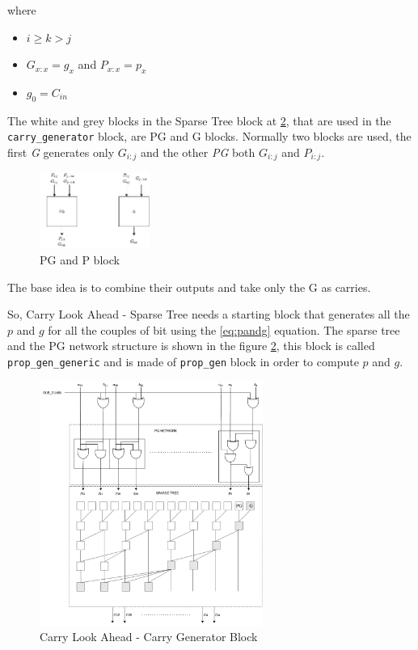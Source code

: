 \begin{itemize}
    where
    \begin{itemize}
        \itemsep0sp
        \item $i \ge k > j$
        \item $G_{x:x} = g_x$ and $P_{x:x} = p_x$
        \item $g_0 = C_{in}$
    \end{itemize}
    The white and grey blocks in the Sparse Tree block at \ref{fig:pg_network}, that are used in the \texttt{carry\_generator} block, are PG and G blocks.
    Normally two blocks are used, the first \textit{G} generates only $G_{i:j}$ and the other \textit{PG} both $G_{i:j}$ and $P_{i:j}$.
    \begin{figure}[h]
        \centering
        \includegraphics[width=0.32\textwidth]{chapters/5_ExecuteStage/images/PG_and_G.pdf}
        \caption{PG and P block}
        \label{fig:PG_and_G}
    \end{figure}
    The base idea is to combine their outputs and take only the G as carries.
\end{itemize}
So, Carry Look Ahead - Sparse Tree needs a starting block that generates all the $p$ and $g$ for all the couples of bit using the \ref{eq:pandg} equation. The sparse tree and the PG network structure is shown in the figure \ref{fig:pg_network}, this block is called \texttt{prop\_gen\_generic} and is made of \texttt{prop\_gen} block in order to compute $p$ and $g$.
\begin{figure}[H]
    \centering
    \includegraphics[width=0.65\textwidth]{chapters/5_ExecuteStage/images/CLA.pdf}
    \caption{Carry Look Ahead - Carry Generator Block}
    \label{fig:pg_network}
\end{figure}
